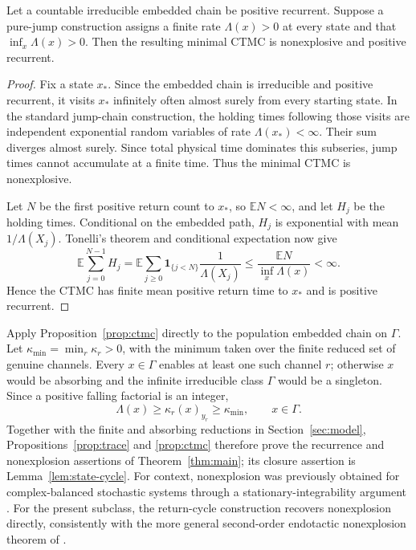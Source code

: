 \begin{proposition}\label{prop:ctmc}
Let a countable irreducible embedded chain be positive recurrent.  Suppose a
pure-jump construction assigns a finite rate \(\Lambda(x)>0\) at every state
and that \(\inf_x\Lambda(x)>0\).  Then the resulting minimal CTMC is
nonexplosive and positive recurrent.
\end{proposition}

\begin{proof}
Fix a state \(x_*\).  Since the embedded chain is irreducible and positive
recurrent, it visits \(x_*\) infinitely often almost surely from every
starting state.  In the standard jump-chain construction, the holding times
following those visits are independent exponential random variables of rate
\(\Lambda(x_*)<\infty\).  Their sum diverges almost surely.  Since total
physical time dominates this subseries, jump times cannot accumulate at a
finite time.  Thus the minimal CTMC is nonexplosive.

Let \(N\) be the first positive return count to \(x_*\), so
\(\mathbb EN<\infty\), and let \(H_j\) be the holding times.  Conditional on
the embedded path, \(H_j\) is exponential with mean \(1/\Lambda(X_j)\).
Tonelli's theorem and conditional expectation now give
\[
 \mathbb E\sum_{j=0}^{N-1}H_j
 =\mathbb E\sum_{j\ge0}\mathbf1_{\{j<N\}}
   \frac1{\Lambda(X_j)}
 \le\frac{\mathbb EN}{\inf_x\Lambda(x)}<\infty.
\]
Hence the CTMC has finite mean positive return time to \(x_*\) and is
positive recurrent.
\end{proof}

Apply Proposition~\ref{prop:ctmc} directly to the population embedded chain on
\(\Gamma\).  Let \(\kappa_{\min}=\min_r\kappa_r>0\), with the minimum taken
over the finite reduced set of genuine channels.  Every \(x\in\Gamma\) enables
at least one such channel \(r\); otherwise \(x\) would be absorbing and the
infinite irreducible class \(\Gamma\) would be a singleton.  Since a positive
falling factorial is an integer,
\begin{equation}\label{eq:rate-lower}
  \Lambda(x)\ge\kappa_r(x)_{y_r}\ge\kappa_{\min},
  \qquad x\in\Gamma.
\end{equation}
Together with the finite and absorbing reductions in
Section~\ref{sec:model}, Propositions~\ref{prop:trace} and \ref{prop:ctmc}
therefore prove the recurrence and nonexplosion assertions of
Theorem~\ref{thm:main}; its closure assertion is
Lemma~\ref{lem:state-cycle}.  For context, nonexplosion was previously obtained for
complex-balanced stochastic systems through a stationary-integrability
argument \citep{AndersonCappellettiKoyamaKurtz2018}.  For the present subclass,
the return-cycle construction recovers nonexplosion directly, consistently
with the more general second-order endotactic nonexplosion theorem of
\citet{Xu2026}.

